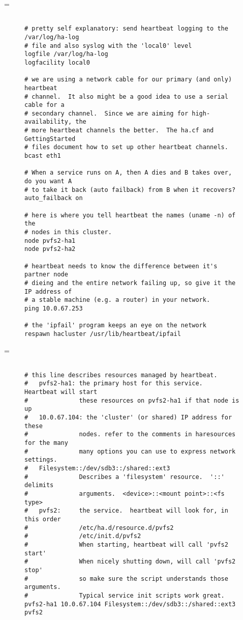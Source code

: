 \documentclass[11pt]{article}
\makeatletter
\let\realnormalsize=\normalsize
\def\preveqno{}\let\real@float=\@float \let\realend@float=\end@float
\def\@float{\let\@savefreelist\@freelist\real@float}
\def\liih@math{\ifmmode$\else\bad@math\fi}
\def\end@float{\realend@float\global\let\@freelist\@savefreelist}
\def\adjustnormalsize{\def\normalsize{\mathsurround=0pt \realnormalsize
 \parindent=0pt\abovedisplayskip=0pt\belowdisplayskip=0pt}%
 \def\phantompar{\csname par\endcsname}\normalsize}%
\def\lthtmltypeout#1{{\let\protect\string \immediate\write\lthtmlwrite{#1}}}%
\newcommand\lthtmlvboxmathA{\adjustnormalsize\setbox\sizebox=\vbox\bgroup %
 \let\ifinner=\iffalse \let\)\liih@math }%
\newcommand\lthtmlboxmathZ{\@next\next\@currlist{}{\def\next{\voidb@x}}%
 \expandafter\box\next\egroup}%
\newcommand\lthtmlmathtype[1]{\gdef\lthtmlmathenv{#1}}%
\newcommand\lthtmllogmath{\lthtmltypeout{l2hSize %
:\lthtmlmathenv:\the\ht\sizebox::\the\dp\sizebox::\the\wd\sizebox.\preveqno}}%
\newcommand\lthtmlfigureA[1]{\let\@savefreelist\@freelist
       \lthtmlmathtype{#1}\lthtmlvboxmathA}%
\newcommand\lthtmlfigureZ{\lthtmlboxmathZ\lthtmllogmath\copy\sizebox
       \global\let\@freelist\@savefreelist}%
\def\lthtmlcheckvsize{\ifdim\ht\sizebox<\vsize 
  \ifdim\wd\sizebox<\hsize\expandafter\hfill\fi \expandafter\vfill
  \else\expandafter\vss\fi}%
\makeatother
\begin{document}
{\newpage\clearpage
\lthtmlfigureA{figure46}%
\begin{figure}\begin{scriptsize}
\begin{verbatim}

# pretty self explanatory: send heartbeat logging to the /var/log/ha-log
# file and also syslog with the 'local0' level
logfile /var/log/ha-log
logfacility local0

# we are using a network cable for our primary (and only) heartbeat
# channel.  It also might be a good idea to use a serial cable for a
# secondary channel.  Since we are aiming for high-availability, the
# more heartbeat channels the better.  The ha.cf and GettingStarted
# files document how to set up other heartbeat channels.
bcast eth1

# When a service runs on A, then A dies and B takes over, do you want A
# to take it back (auto failback) from B when it recovers?  
auto_failback on

# here is where you tell heartbeat the names (uname -n) of the
# nodes in this cluster.
node pvfs2-ha1
node pvfs2-ha2

# heartbeat needs to know the difference between it's partner node
# dieing and the entire network failing up, so give it the IP address of
# a stable machine (e.g. a router) in your network.
ping 10.0.67.253

# the 'ipfail' program keeps an eye on the network
respawn hacluster /usr/lib/heartbeat/ipfail\end{verbatim}
\end{scriptsize}
\end{figure}%
\lthtmlfigureZ
\lthtmlcheckvsize\clearpage}

{\newpage\clearpage
\lthtmlfigureA{figure54}%
\begin{figure}\begin{scriptsize}
\begin{verbatim}

# this line describes resources managed by heartbeat.  
#   pvfs2-ha1: the primary host for this service.  Heartbeat will start
#              these resources on pvfs2-ha1 if that node is up
#   10.0.67.104: the 'cluster' (or shared) IP address for these
#              nodes. refer to the comments in haresources for the many
#              many options you can use to express network settings. 
#   Filesystem::/dev/sdb3::/shared::ext3
#              Describes a 'filesystem' resource.  '::' delimits
#              arguments.  <device>::<mount point>::<fs type>
#   pvfs2:     the service.  heartbeat will look for, in this order
#              /etc/ha.d/resource.d/pvfs2 
#              /etc/init.d/pvfs2
#              When starting, heartbeat will call 'pvfs2 start'
#              When nicely shutting down, will call 'pvfs2 stop'
#              so make sure the script understands those arguments.
#              Typical service init scripts work great.
pvfs2-ha1 10.0.67.104 Filesystem::/dev/sdb3::/shared::ext3 pvfs2\end{verbatim}
\end{scriptsize}
\end{figure}%
\lthtmlfigureZ
\lthtmlcheckvsize\clearpage}
\end{document}
